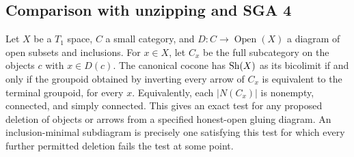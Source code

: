 \subsection{Comparison with unzipping and SGA 4}
\begin{result}\label{A1.5}
Let $X$ be a $T_1$ space, $C$ a small category, and
$D:C\to\operatorname{Open}(X)$ a diagram of open subsets and inclusions.
For $x\in X$, let $C_x$ be the full subcategory on the objects $c$ with
$x\in D(c)$. The canonical cocone has $\operatorname{Sh}(X)$ as its bicolimit if and
only if the groupoid obtained by inverting every arrow of $C_x$ is
equivalent to the terminal groupoid, for every $x$. Equivalently, each
$|N(C_x)|$ is nonempty, connected, and simply connected.
This gives an exact test for any proposed deletion of objects or arrows
from a specified honest-open gluing diagram. An inclusion-minimal
subdiagram is precisely one satisfying this test for which every further
permitted deletion fails the test at some point.
\end{result}
